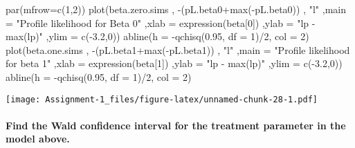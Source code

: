 \documentclass[
]{article}
\newenvironment{Shaded}{\begin{snugshade}}{\end{snugshade}}
\newcommand{\AttributeTok}[1]{\textcolor[rgb]{0.77,0.63,0.00}{#1}}
\newcommand{\DecValTok}[1]{\textcolor[rgb]{0.00,0.00,0.81}{#1}}
\newcommand{\FloatTok}[1]{\textcolor[rgb]{0.00,0.00,0.81}{#1}}
\newcommand{\FunctionTok}[1]{\textcolor[rgb]{0.00,0.00,0.00}{#1}}
\newcommand{\NormalTok}[1]{#1}
\newcommand{\SpecialCharTok}[1]{\textcolor[rgb]{0.00,0.00,0.00}{#1}}
\newcommand{\StringTok}[1]{\textcolor[rgb]{0.31,0.60,0.02}{#1}}
\begin{document}
\begin{Shaded}
\begin{Highlighting}[]
\FunctionTok{par}\NormalTok{(}\AttributeTok{mfrow=}\FunctionTok{c}\NormalTok{(}\DecValTok{1}\NormalTok{,}\DecValTok{2}\NormalTok{))}
\FunctionTok{plot}\NormalTok{(beta.zero.sims}
\NormalTok{     , }\SpecialCharTok{{-}}\NormalTok{(pL.beta0}\SpecialCharTok{+}\FunctionTok{max}\NormalTok{(}\SpecialCharTok{{-}}\NormalTok{pL.beta0))}
\NormalTok{     , }\StringTok{"l"}
\NormalTok{     ,}\AttributeTok{main =} \StringTok{"Profile likelihood for Beta 0"}
\NormalTok{     ,}\AttributeTok{xlab =} \FunctionTok{expression}\NormalTok{(beta[}\DecValTok{0}\NormalTok{])}
\NormalTok{     ,}\AttributeTok{ylab =} \StringTok{"lp {-} max(lp)"}
\NormalTok{     ,}\AttributeTok{ylim =} \FunctionTok{c}\NormalTok{(}\SpecialCharTok{{-}}\FloatTok{3.2}\NormalTok{,}\DecValTok{0}\NormalTok{))}
\FunctionTok{abline}\NormalTok{(}\AttributeTok{h =} \SpecialCharTok{{-}}\FunctionTok{qchisq}\NormalTok{(}\FloatTok{0.95}\NormalTok{, }\AttributeTok{df =} \DecValTok{1}\NormalTok{)}\SpecialCharTok{/}\DecValTok{2}\NormalTok{, }\AttributeTok{col =} \DecValTok{2}\NormalTok{)}
\FunctionTok{plot}\NormalTok{(beta.one.sims}
\NormalTok{     , }\SpecialCharTok{{-}}\NormalTok{(pL.beta1}\SpecialCharTok{+}\FunctionTok{max}\NormalTok{(}\SpecialCharTok{{-}}\NormalTok{pL.beta1))}
\NormalTok{     , }\StringTok{"l"}
\NormalTok{     ,}\AttributeTok{main =} \StringTok{"Profile likelihood for beta 1"}
\NormalTok{     ,}\AttributeTok{xlab =} \FunctionTok{expression}\NormalTok{(beta[}\DecValTok{1}\NormalTok{])}
\NormalTok{     ,}\AttributeTok{ylab =} \StringTok{"lp {-} max(lp)"}
\NormalTok{     ,}\AttributeTok{ylim =} \FunctionTok{c}\NormalTok{(}\SpecialCharTok{{-}}\FloatTok{3.2}\NormalTok{,}\DecValTok{0}\NormalTok{))}
\FunctionTok{abline}\NormalTok{(}\AttributeTok{h =} \SpecialCharTok{{-}}\FunctionTok{qchisq}\NormalTok{(}\FloatTok{0.95}\NormalTok{, }\AttributeTok{df =} \DecValTok{1}\NormalTok{)}\SpecialCharTok{/}\DecValTok{2}\NormalTok{, }\AttributeTok{col =} \DecValTok{2}\NormalTok{)}
\end{Highlighting}
\end{Shaded}

\texttt{[image: Assignment-1\_files/figure-latex/unnamed-chunk-28-1.pdf]}

\hypertarget{find-the-wald-confidence-interval-for-the-treatment-parameter-in-the-model-above.}{%
\paragraph{Find the Wald confidence interval for the treatment parameter
in the model
above.}\label{find-the-wald-confidence-interval-for-the-treatment-parameter-in-the-model-above.}}
\end{document}
